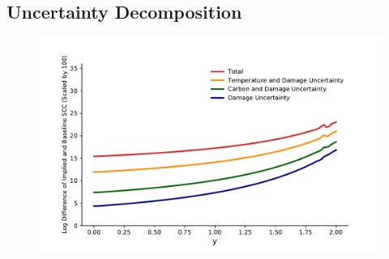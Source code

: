 \documentclass[11pt]{article}
\begin{document}
\subsection{Uncertainty Decomposition}
\begin{figure}[H]
		\center
		\includegraphics[height=.35\textheight]{uncertainty_decomposition.pdf}
\end{figure}
\end{document}
